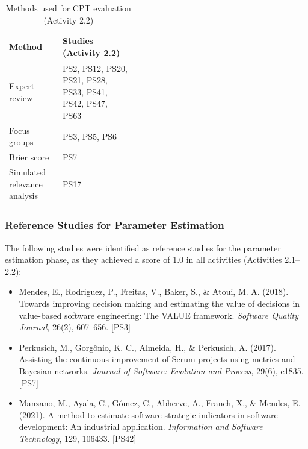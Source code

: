 \begin{table}[t]
\caption{Methods used for CPT evaluation (Activity 2.2)}
\label{tab:app_methods_cpt_evaluation}
\centering
\small
\setlength{\tabcolsep}{4pt}
\renewcommand{\arraystretch}{1.15}
\begin{tabularx}{\linewidth}{@{}>{\raggedright\arraybackslash}p{0.42\linewidth}
                            >{\raggedright\arraybackslash}X@{}}
\toprule
\textbf{Method} & \textbf{Studies (Activity 2.2)} \\
\midrule
Expert review & PS2, PS12, PS20, PS21, PS28, PS33, PS41, PS42, PS47, PS63 \\
Focus groups & PS3, PS5, PS6 \\
Brier score & PS7 \\
Simulated relevance analysis & PS17 \\
\bottomrule
\end{tabularx}
\end{table}

\subsubsection{Reference Studies for Parameter Estimation}

The following studies were identified as reference studies for the parameter estimation phase, as they achieved a score of 1.0 in all activities (Activities 2.1--2.2):

\begin{itemize}
    \item Mendes, E., Rodriguez, P., Freitas, V., Baker, S., \& Atoui, M. A. (2018). Towards improving decision making and estimating the value of decisions in value-based software engineering: The VALUE framework. \textit{Software Quality Journal}, 26(2), 607--656. [PS3]
    
    \item Perkusich, M., Gorgônio, K. C., Almeida, H., \& Perkusich, A. (2017). Assisting the continuous improvement of Scrum projects using metrics and Bayesian networks. \textit{Journal of Software: Evolution and Process}, 29(6), e1835. [PS7]
    
    \item Manzano, M., Ayala, C., Gómez, C., Abherve, A., Franch, X., \& Mendes, E. (2021). A method to estimate software strategic indicators in software development: An industrial application. \textit{Information and Software Technology}, 129, 106433. [PS42]
\end{itemize}

